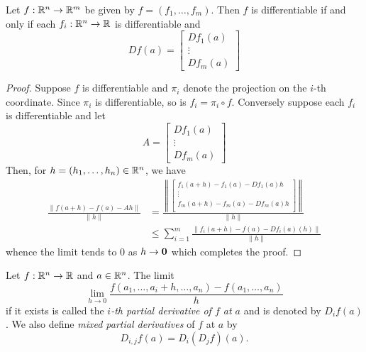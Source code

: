 \begin{proposition}
    Let $f:\mathbb{R}^n\to\mathbb{R}^m$ be given by $f = (f_1,\ldots,f_m)$. Then $f$ is differentiable if and only if each $f_i:\mathbb{R}^n\to\mathbb{R}$ is differentiable and 
    \begin{equation*}
        Df(a) = 
        \begin{bmatrix}
            Df_1(a) \\ \vdots \\ Df_m(a)
        \end{bmatrix}
    \end{equation*}
\end{proposition}
\begin{proof}
    Suppose $f$ is differentiable and $\pi_i$ denote the projection on the $i$-th coordinate. Since $\pi_i$ is differentiable, so is $f_i = \pi_i\circ f$. Conversely suppose each $f_i$ is differentiable and let 
    \begin{equation*}
        A = 
        \begin{bmatrix}
            Df_1(a) \\ \vdots \\ Df_m(a)
        \end{bmatrix}
    \end{equation*}
    Then, for $h = (h_1,\dots,h_n)\in\mathbb{R}^n$, we have 
    \begin{align*}
        \frac{\|f(a + h) - f(a) - Ah\|}{\|h\|} &= \frac{\left\|
            \begin{bmatrix}
                f_1(a + h) - f_1(a) - Df_1(a)h\\
                \vdots\\
                f_m(a + h) - f_m(a) - Df_m(a)h\\
            \end{bmatrix}
        \right\|}{\|h\|}\\
        &\le\sum_{i = 1}^m\frac{\|f_i(a + h) - f(a) - Df_i(a)(h)\|}{\|h\|}
    \end{align*}
    whence the limit tends to $0$ as $h\to\mathbf{0}$ which completes the proof.
\end{proof}

\begin{definition}
    Let $f:\mathbb{R}^n\to\mathbb{R}$ and $a\in\mathbb{R}^n$. The limit 
    \begin{equation*}
        \lim_{h\to 0}\frac{f(a_1,\ldots,a_i + h,\ldots,a_n) - f(a_1,\ldots,a_n)}{h}
    \end{equation*}
    if it exists is called the \emph{$i$-th partial derivative of $f$ at $a$} and is denoted by $D_if(a)$. We also define \emph{mixed partial derivatives} of $f$ at $a$ by 
    \begin{equation*}
        D_{i,j}f(a) = D_i(D_jf)(a).
    \end{equation*}
\end{definition}

